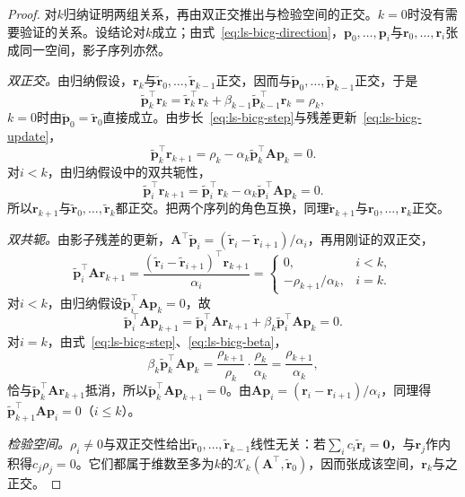 \begin{proof}
对$k$归纳证明两组关系，再由双正交推出与检验空间的正交。$k=0$时没有需要验证的关系。设结论对$k$成立；由式~\eqref{eq:ls-bicg-direction}，$\bm p_0,\ldots,\bm p_i$与$\bm r_0,\ldots,\bm r_i$张成同一空间，影子序列亦然。

\emph{双正交。}由归纳假设，$\bm r_k$与$\widetilde{\bm r}_0,\ldots,\widetilde{\bm r}_{k-1}$正交，因而与$\widetilde{\bm p}_0,\ldots,\widetilde{\bm p}_{k-1}$正交，于是
\[
 \widetilde{\bm p}_k^\top\bm r_k=\widetilde{\bm r}_k^\top\bm r_k+\beta_{k-1}\widetilde{\bm p}_{k-1}^\top\bm r_k=\rho_k ,
\]
$k=0$时由$\widetilde{\bm p}_0=\widetilde{\bm r}_0$直接成立。由步长~\eqref{eq:ls-bicg-step}与残差更新~\eqref{eq:ls-bicg-update}，
\[
 \widetilde{\bm p}_k^\top\bm r_{k+1}=\rho_k-\alpha_k\widetilde{\bm p}_k^\top\bm A\bm p_k=0 .
\]
对$i<k$，由归纳假设中的双共轭性，
\[
 \widetilde{\bm p}_i^\top\bm r_{k+1}=\widetilde{\bm p}_i^\top\bm r_k-\alpha_k\widetilde{\bm p}_i^\top\bm A\bm p_k=0 .
\]
所以$\bm r_{k+1}$与$\widetilde{\bm r}_0,\ldots,\widetilde{\bm r}_k$都正交。把两个序列的角色互换，同理$\widetilde{\bm r}_{k+1}$与$\bm r_0,\ldots,\bm r_k$正交。

\emph{双共轭。}由影子残差的更新，$\bm A^\top\widetilde{\bm p}_i=(\widetilde{\bm r}_i-\widetilde{\bm r}_{i+1})/\alpha_i$，再用刚证的双正交，
\[
 \widetilde{\bm p}_i^\top\bm A\bm r_{k+1}=\frac{(\widetilde{\bm r}_i-\widetilde{\bm r}_{i+1})^\top\bm r_{k+1}}{\alpha_i}
 =\begin{cases}0,&i<k,\\-\rho_{k+1}/\alpha_k,&i=k .\end{cases}
\]
对$i<k$，由归纳假设$\widetilde{\bm p}_i^\top\bm A\bm p_k=0$，故
\[
 \widetilde{\bm p}_i^\top\bm A\bm p_{k+1}=\widetilde{\bm p}_i^\top\bm A\bm r_{k+1}+\beta_k\widetilde{\bm p}_i^\top\bm A\bm p_k=0 .
\]
对$i=k$，由式~\eqref{eq:ls-bicg-step}、\eqref{eq:ls-bicg-beta}，
\[
 \beta_k\widetilde{\bm p}_k^\top\bm A\bm p_k=\frac{\rho_{k+1}}{\rho_k}\cdot\frac{\rho_k}{\alpha_k}=\frac{\rho_{k+1}}{\alpha_k},
\]
恰与$\widetilde{\bm p}_k^\top\bm A\bm r_{k+1}$抵消，所以$\widetilde{\bm p}_k^\top\bm A\bm p_{k+1}=0$。由$\bm A\bm p_i=(\bm r_i-\bm r_{i+1})/\alpha_i$，同理得$\widetilde{\bm p}_{k+1}^\top\bm A\bm p_i=0$（$i\le k$）。

\emph{检验空间。}$\rho_i\ne0$与双正交性给出$\widetilde{\bm r}_0,\ldots,\widetilde{\bm r}_{k-1}$线性无关：若$\sum_ic_i\widetilde{\bm r}_i=\bm 0$，与$\bm r_j$作内积得$c_j\rho_j=0$。它们都属于维数至多为$k$的$\mathcal K_k(\bm A^\top,\widetilde{\bm r}_0)$，因而张成该空间，$\bm r_k$与之正交。
\end{proof}

